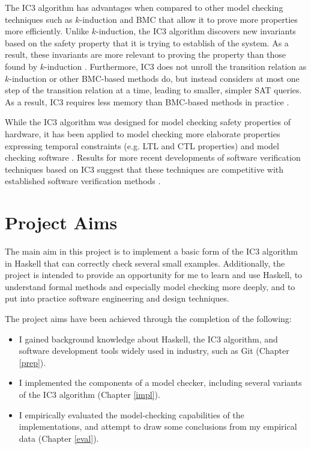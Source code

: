 \documentclass[12pt,a4paper,twoside,openright]{report}
\begin{document}
The IC3 algorithm has advantages when compared to other model checking
techniques such as $k$-induction and BMC that allow it to prove more
properties more efficiently. Unlike $k$-induction, the IC3 algorithm
discovers new invariants based on the safety property that it is trying to
establish of the system. As a result, these
invariants are more relevant to proving the property than those found
by $k$-induction \cite{bradley12}.
Furthermore, IC3 does not unroll the transition relation as $k$-induction
or other BMC-based methods do, but instead considers at most one step
of the transition relation at a time, leading to smaller,
simpler SAT queries. As a result, IC3 requires less memory than BMC-based
methods in practice \cite{bradley12}.


While the IC3 algorithm was designed for model checking safety properties of hardware,
it has been applied to model checking more
elaborate properties expressing temporal constraints (e.g. LTL and CTL
properties) and model checking software
\cite{bradley12,cimatti12}.
Results for more recent developments of software verification
techniques based on IC3 suggest that these techniques are competitive with
established software verification methods \cite{birgmeier14}.

\section{Project Aims}

The main aim in this project is to implement a basic form of the IC3 algorithm in
Haskell that can correctly check several
small examples. Additionally, the project is intended to provide an opportunity
for me to learn and use Haskell, to understand formal methods and especially model
checking more deeply, and to put into practice software engineering and design techniques.

The project aims have been achieved through the completion of the following:
\begin{itemize}
\item I gained background knowledge about Haskell, the IC3 algorithm, and software
development tools widely used in industry, such as Git (Chapter \ref{prep}).
\item I implemented the components of a model checker, including several variants of
the IC3 algorithm (Chapter \ref{impl}).
\item I empirically evaluated the model-checking capabilities of the implementations,
and attempt to draw some conclusions from my empirical data
(Chapter \ref{eval}).
\end{itemize}
\end{document}
